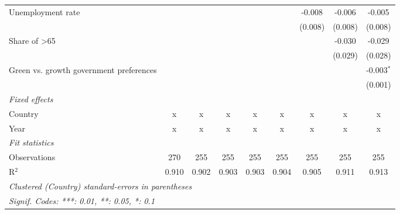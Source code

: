 \begin{table}[htbp]
\begin{tabular}{lcccccccc}
      Unemployment rate                                          &         &         &         &         &         & -0.008  & -0.006  & -0.005\\   
                                                                 &         &         &         &         &         & (0.008) & (0.008) & (0.008)\\   
      Share of >65                                               &         &         &         &         &         &         & -0.030  & -0.029\\   
                                                                 &         &         &         &         &         &         & (0.029) & (0.028)\\   
      Green vs. growth government preferences                    &         &         &         &         &         &         &         & -0.003$^{*}$\\   
                                                                 &         &         &         &         &         &         &         & (0.001)\\   
      \emph{Fixed effects}\\
      Country                                                    & x       & x       & x       & x       & x       & x       & x       & x\\  
      Year                                                       & x       & x       & x       & x       & x       & x       & x       & x\\  
      \midrule \emph{Fit statistics}\\
      Observations                                               & 270     & 255     & 255     & 255     & 255     & 255     & 255     & 255\\  
      R$^2$                                                      & 0.910   & 0.902   & 0.903   & 0.903   & 0.904   & 0.905   & 0.911   & 0.913\\  
      \midrule
      \multicolumn{9}{l}{\emph{Clustered (Country) standard-errors in parentheses}}\\
      \multicolumn{9}{l}{\emph{Signif. Codes: ***: 0.01, **: 0.05, *: 0.1}}\\
   \end{tabular}
\end{table}


